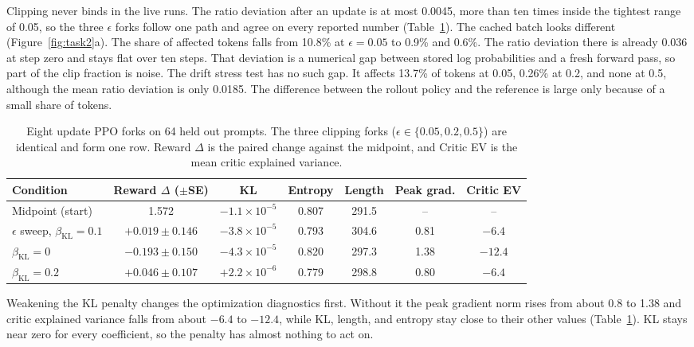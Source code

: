 \documentclass{article}
\begin{document}
Clipping never binds in the live runs. The ratio deviation after an update is
at most 0.0045, more than ten times inside the tightest range of 0.05, so the
three $\epsilon$ forks follow one path and agree on every reported number
(Table~\ref{tab:task2}). The cached batch looks different
(Figure~\ref{fig:task2}a). The share of affected tokens falls from 10.8\% at
$\epsilon=0.05$ to 0.9\% and 0.6\%. The ratio deviation there is already 0.036
at step zero and stays flat over ten steps. That deviation is a numerical gap
between stored log probabilities and a fresh forward pass, so part of the clip
fraction is noise. The drift stress test has no such gap. It affects 13.7\% of
tokens at 0.05, 0.26\% at 0.2, and none at 0.5, although the mean ratio
deviation is only 0.0185. The difference between the rollout policy and the
reference is large only because of a small share of tokens.

\begin{table}[!htb]
  \centering
  \small
  \begin{tabular}{lcccccc}
    \toprule
    Condition & Reward $\Delta$ ($\pm$SE) & KL & Entropy & Length & Peak grad. & Critic EV \\
    \midrule
    Midpoint (start)                              & 1.572 & $-1.1\times10^{-5}$ & 0.807 & 291.5 & -- & -- \\
    $\epsilon$ sweep, $\beta_{\text{KL}}=0.1$ & $+0.019\pm0.146$ & $-3.8\times10^{-5}$ & 0.793 & 304.6 & 0.81 & $-6.4$ \\
    $\beta_{\text{KL}}=0$                         & $-0.193\pm0.150$ & $-4.3\times10^{-5}$ & 0.820 & 297.3 & 1.38 & $-12.4$ \\
    $\beta_{\text{KL}}=0.2$                       & $+0.046\pm0.107$ & $+2.2\times10^{-6}$ & 0.779 & 298.8 & 0.80 & $-6.4$ \\
    \bottomrule
  \end{tabular}
  \vspace{8pt}
  \caption{Eight update PPO forks on 64 held out prompts. The three clipping
  forks ($\epsilon\in\{0.05,0.2,0.5\}$) are identical and form one row. Reward $\Delta$ is the paired change
  against the midpoint, and Critic EV is the mean critic explained variance.}
  \label{tab:task2}
\end{table}

Weakening the KL penalty changes the optimization diagnostics first. Without it
the peak gradient norm rises from about 0.8 to 1.38 and critic explained
variance falls from about $-6.4$ to $-12.4$, while KL, length, and entropy stay
close to their other values (Table~\ref{tab:task2}). KL stays near zero for every
coefficient, so the penalty has almost nothing to act on.
\end{document}
